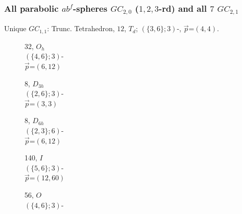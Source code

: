 \documentclass{beamer}
\begin{document}
\begin{frame}\frametitle{All parabolic $ab^f$-spheres  
$GC_{2,0}$ ($1,2,3$-rd) 
 and all $7$ $GC_{2,1}$}

\vspace{-2mm}
Unique $GC_{1,1}$:
Trunc. Tetrahedron, $12$, $T_d$;
$(\{3,6\};3)$-, $\vec{p}$=$(4,4)$. 

\begin{figure}
\small
\begin{center}
\begin{minipage}[b]{20mm}
\centering
{}\par
 32, $O_h$\\
 $(\{4,6\};3)$-\\
$\vec{p}$=$(6,12)$ 
 \end{minipage}
 \begin{minipage}[b]{18mm}
\centering
{}\par
8, $D_{3h}$\\
$(\{2,6\};3)$-\\
$\vec{p}$=$(3,3)$
\end{minipage}  
\begin{minipage}[b]{20mm}
\centering
{}\par
8, $D_{6h}$\\ 
$(\{2,3\};6)$-\\
$\vec{p}$=$(6,12)$
\end{minipage}
\begin{minipage}[b]{20mm}
\centering
{}\par
140, $I$\\
$(\{5,6\};3)$-\\
$\vec{p}$=$(12,60)$
\end{minipage}
\begin{minipage}[b]{20mm}
\centering
{}\par
56, $O$ \\
$(\{4,6\};3)$-\\

\end{minipage}
\end{center}
\end{figure}
\end{frame}
\end{document}
